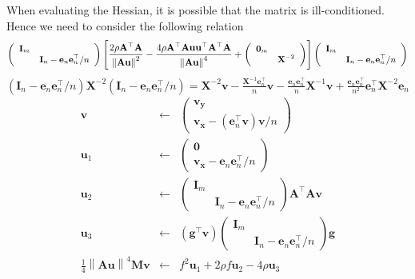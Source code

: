 \documentclass{article}
\newcommand{\x}{\mathbf{x}}
\newcommand{\A}{\mathbf{A}}
\newcommand{\0}{\textbf{0}}
\newcommand{\e}{\mathbf{e}}
\newcommand{\X}{\mathbf{X}}
\newcommand{\I}{\mathbf{I}}
\newcommand{\g}{\mathbf{g}}
\newcommand{\M}{\mathbf{M}}
\newcommand{\y}{\mathbf{y}}
\newcommand{\tmu}{\mathbf{u}}
\newcommand{\tmv}{\mathbf{v}}
\begin{document}
When evaluating the Hessian, it is possible that the matrix is
ill-conditioned. Hence we need to consider the following relation
\[ \small{\left(\begin{array}{cc}
     \I_m & \\
     & \I_n - \e_n \e_n^{\top} / n
   \end{array}\right)} \left[ \frac{2 \rho \A^{\top} \A}{\left\| \A \tmu
   \right\|^2} - \frac{4 \rho \A^{\top} \A \tmu \tmu^{\top} \A^{\top}
   \A}{\left\| \A \tmu \right\|^4} + \small{\left(\begin{array}{cc}
     \0_m & \\
     & \X^{- 2}
   \end{array}\right)} \right] \small{\left(\begin{array}{cc}
     \I_m & \\
     & \I_n - \e_n \e_n^{\top} / n
   \end{array}\right)} \]
$\left( \I_n - \e_n \e_n^{\top} / n \right) \X^{- 2} \left( \I_n - \e_n
\e_n^{\top} / n \right) = \X^{- 2} \tmv - \frac{\X^{- 1} \e_n^{\top}}{n} \tmv
- \frac{\e_n \e_n^{\top}}{n} \X^{- 1} \tmv + \frac{\e_n \e_n^{\top}}{n^2}
\e_n^{\top} \X^{- 2} \e_n$
\begin{eqnarray*}
  \tmv & \leftarrow & \left(\begin{array}{c}
    \tmv_{\y}\\
    \tmv_{\x} - \left( \e_n^{\top} \tmv \right) \tmv / n
  \end{array}\right)\\
  \tmu_1 & \leftarrow & \left(\begin{array}{c}
    \0\\
    \tmv_{\x} - \e_n \e_n^{\top} / n
  \end{array}\right)\\
  \tmu_2 & \leftarrow & \left(\begin{array}{cc}
    \I_m & \\
    & \I_n - \e_n \e_n^{\top} / n
  \end{array}\right) \A^{\top} \A \tmv\\
  \tmu_3 & \leftarrow & \left( \g^{\top} \tmv \right) \left(\begin{array}{cc}
    \I_m & \\
    & \I_n - \e_n \e_n^{\top} / n
  \end{array}\right) \g\\
  \frac{1}{4} \left\| \A \tmu \right\|^4 \M \tmv & \leftarrow & f^2 \tmu_1 + 2
  \rho f \tmu_2 - 4 \rho \tmu_3
\end{eqnarray*}
\end{document}
